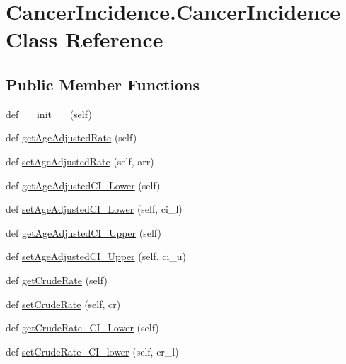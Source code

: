 \hypertarget{class_cancer_incidence_1_1_cancer_incidence}{}\section{Cancer\+Incidence.\+Cancer\+Incidence Class Reference}
\label{class_cancer_incidence_1_1_cancer_incidence}
\subsection*{Public Member Functions}
\begin{DoxyCompactItemize}
\item 
def \hyperlink{class_cancer_incidence_1_1_cancer_incidence_ad426f06ec5738a32bf25a24bad0d5d48}{\+\_\+\+\_\+init\+\_\+\+\_\+} (self)
\item 
def \hyperlink{class_cancer_incidence_1_1_cancer_incidence_a4b774ff7c72de4d71cec56899a9f7862}{get\+Age\+Adjusted\+Rate} (self)
\item 
def \hyperlink{class_cancer_incidence_1_1_cancer_incidence_ac384d7a65a9f6c4907b95a28994ae6a8}{set\+Age\+Adjusted\+Rate} (self, arr)
\item 
def \hyperlink{class_cancer_incidence_1_1_cancer_incidence_a6b7a1de864b12d25e86a70906ef24bbd}{get\+Age\+Adjusted\+C\+I\+\_\+\+Lower} (self)
\item 
def \hyperlink{class_cancer_incidence_1_1_cancer_incidence_a9dff100ca9a7f8547dca88b0d8f383b4}{set\+Age\+Adjusted\+C\+I\+\_\+\+Lower} (self, ci\+\_\+l)
\item 
def \hyperlink{class_cancer_incidence_1_1_cancer_incidence_aa6bd6e0a0f1f9106c7e094bce310c5d4}{get\+Age\+Adjusted\+C\+I\+\_\+\+Upper} (self)
\item 
def \hyperlink{class_cancer_incidence_1_1_cancer_incidence_aab0e4d5aa0b3f7850e30b2ccb9e433fa}{set\+Age\+Adjusted\+C\+I\+\_\+\+Upper} (self, ci\+\_\+u)
\item 
def \hyperlink{class_cancer_incidence_1_1_cancer_incidence_a346895f923cb82648d5add0c5fd4e1c6}{get\+Crude\+Rate} (self)
\item 
def \hyperlink{class_cancer_incidence_1_1_cancer_incidence_abf45feac9bd6017eb8326d51d7e3fec6}{set\+Crude\+Rate} (self, cr)
\item 
def \hyperlink{class_cancer_incidence_1_1_cancer_incidence_a5788d3e3a92f16dfea080a4ee9f9874e}{get\+Crude\+Rate\+\_\+\+C\+I\+\_\+\+Lower} (self)
\item 
def \hyperlink{class_cancer_incidence_1_1_cancer_incidence_af20a3b98541017472d2be3f784460d46}{set\+Crude\+Rate\+\_\+\+C\+I\+\_\+lower} (self, cr\+\_\+l)

\end{DoxyCompactItemize}
